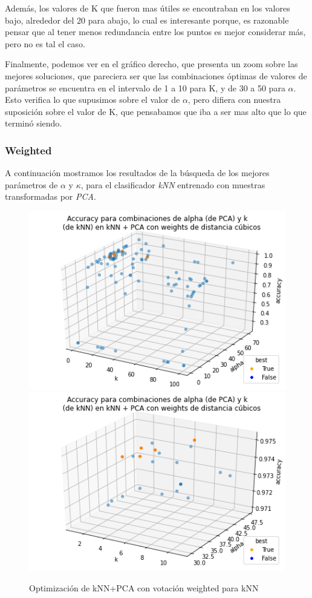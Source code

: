 \documentclass[a4paper]{article}
\begin{document}
      Además, los valores de K que fueron mas útiles se encontraban en los valores bajo, alrededor del 20 para abajo, lo cual es interesante porque, es razonable pensar que al tener menos redundancia entre los puntos es mejor considerar más, pero no es tal el caso.
      
      Finalmente, podemos ver en el gráfico derecho, que presenta un zoom sobre las mejores soluciones, que pareciera ser que las combinaciones óptimas de valores de parámetros se encuentra en el intervalo de 1 a 10 para K, y de 30 a 50 para $\alpha$. Esto verifica lo que supusimos sobre el valor de $\alpha$, pero difiera con nuestra suposición sobre el valor de K, que pensabamos que iba a ser mas alto que lo que terminó siendo.
    \subsubsection{Weighted}
    A continuación mostramos los resultados de la búsqueda de los mejores parámetros de $\alpha$ y $\kappa$, para el clasificador \emph{kNN} entrenado con muestras transformadas por \emph{PCA}.
    
    \begin{figure}[H]
            \centering
            \includegraphics[scale=0.5]{img/exp/pca/opt_knn_pca_weight.png}
            \includegraphics[scale=0.5]{img/exp/pca/opt_knn_pca_weight_zoomed.png}
            \caption{Optimización de kNN+PCA con votación weighted para kNN}
            \label{fig:knn-pca-weight}
    \end{figure}
    
\end{document}
